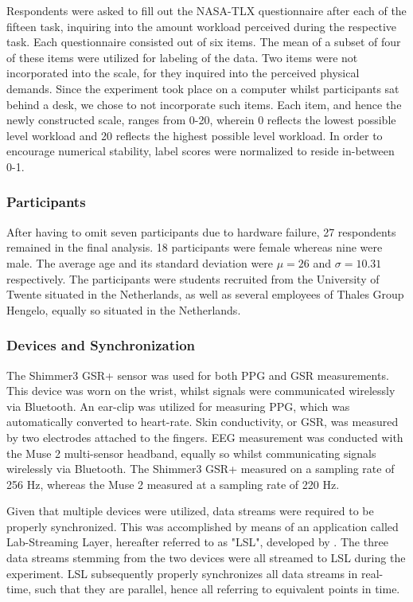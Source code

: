 \documentclass[fleqn,11pt]{paper}
\begin{document}
Respondents were asked to fill out the NASA-TLX questionnaire after each of the fifteen task, inquiring into the amount workload perceived during the respective task. Each questionnaire consisted out of six items. The mean of a subset of four of these items were utilized for labeling of the data. Two items were not incorporated into the scale, for they inquired into the perceived physical demands. Since the experiment took place on a computer whilst participants sat behind a desk, we chose to not incorporate such items. Each item, and hence the newly constructed scale, ranges from 0-20, wherein 0 reflects the lowest possible level workload and 20 reflects the highest possible level workload.  In order to encourage numerical stability, label scores were normalized to reside in-between 0-1. 

\subsubsection*{Participants}
After having to omit seven participants due to hardware failure, 27 respondents remained in the final analysis.  18 participants were female whereas nine were male. The average age and its standard deviation were $\mu =26$ and $\sigma = 10.31$ respectively. The participants were students recruited from the University of Twente situated in the Netherlands, as well as several employees of Thales Group Hengelo, equally so situated in the Netherlands. 

\subsubsection*{Devices and Synchronization}
The Shimmer3 GSR+ sensor was used for both PPG and GSR measurements. This device was worn on the wrist, whilst signals were communicated wirelessly via Bluetooth. An ear-clip was utilized for measuring PPG, which was automatically converted to heart-rate. Skin conductivity, or GSR, was measured by two electrodes attached to the fingers. EEG measurement was conducted with the Muse 2 multi-sensor headband, equally so whilst communicating signals wirelessly via Bluetooth. The Shimmer3 GSR+ measured on a sampling rate of 256 Hz, whereas the Muse 2 measured at a sampling rate of 220 Hz. 

Given that multiple devices were utilized, data streams were required to be properly synchronized. This was accomplished by means of an application called Lab-Streaming Layer, hereafter referred to as "LSL", developed by . The three data streams stemming from the two devices were all streamed to LSL during the experiment. LSL subsequently properly synchronizes all data streams in real-time,  such that they are parallel, hence all referring to equivalent points in time. 
\end{document}
